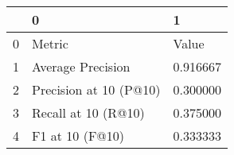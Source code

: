 \begin{tabular}{lll}
\toprule
 & 0 & 1 \\
\midrule
0 & Metric & Value \\
1 & Average Precision & 0.916667 \\
2 & Precision at 10 (P@10) & 0.300000 \\
3 & Recall at 10 (R@10) & 0.375000 \\
4 & F1 at 10 (F@10) & 0.333333 \\
\bottomrule
\end{tabular}
